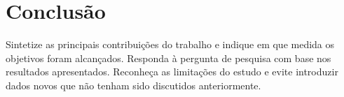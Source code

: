 \section{Conclusão}
\label{sec:conclusao}

Sintetize as principais contribuições do trabalho e indique em que medida
os objetivos foram alcançados. Responda à pergunta de pesquisa com base nos
resultados apresentados. Reconheça as limitações do estudo e evite introduzir
dados novos que não tenham sido discutidos anteriormente.

